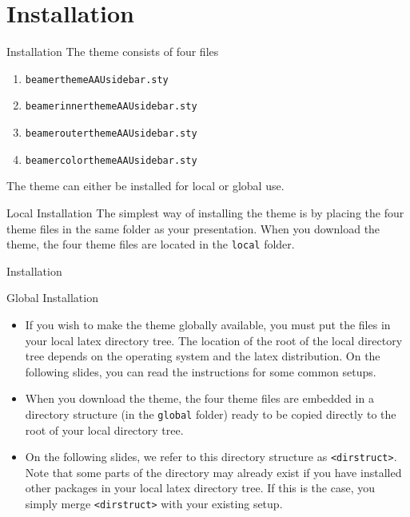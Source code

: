 \documentclass[10pt]{beamer}
\begin{document}
\section{Installation}
\begin{frame}{Installation}
  The theme consists of four files
  \begin{enumerate}
    \item {\tt beamerthemeAAUsidebar.sty}
    \item {\tt beamerinnerthemeAAUsidebar.sty}
    \item {\tt beamerouterthemeAAUsidebar.sty}
    \item {\tt beamercolorthemeAAUsidebar.sty}
  \end{enumerate}
  The theme can either be installed for local or global use.
  \pause
  \begin{block}{Local Installation}
    The simplest way of installing the theme is by placing the four theme files in the same folder as your presentation. When you download the theme, the four theme files are located in the {\tt local} folder.
  \end{block}
\end{frame}

\begin{frame}{Installation}
  \begin{block}{Global Installation}
  \begin{itemize}
     \item If you wish to make the theme globally available, you must put the files in your local latex directory tree. The location of the root of the local directory tree depends on the operating system and the latex distribution. On the following slides, you can read the instructions for some common setups.
    \item When you download the theme, the four theme files are embedded in a directory structure (in the {\tt global} folder) ready to be copied directly to the root of your local directory tree.
    \item On the following slides, we refer to this directory structure as {\tt <dirstruct>}. \alert{Note} that some parts of the directory may already exist if you have installed other packages in your local latex directory tree. If this is the case, you simply merge {\tt <dirstruct>} with your existing setup.
  \end{itemize}
  \end{block}
\end{frame}
\end{document}
